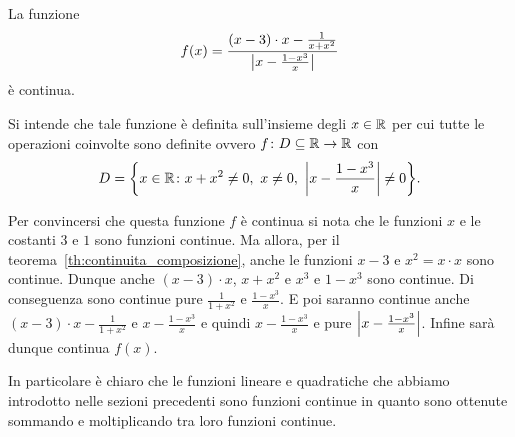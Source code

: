 \begin{example}
La funzione
\[
f(x) = \frac{(x-3)\cdot x -\frac{1}{x+x^2}}{{\left|x-\frac{1-x^3}{x}\right|}}
\]
è continua.

Si intende che tale funzione è definita sull'insieme degli $x\in \mathbb R$
per cui tutte le operazioni coinvolte sono definite ovvero
$f\colon D \subseteq \mathbb R \to \mathbb R$
con
\[
  D = \ENCLOSE{x\in \RR \colon x+x^2 \neq 0,\ x\neq 0,\ \abs{x-\frac{1-x^3}{x}}\neq 0}.
\]

Per convincersi che questa funzione $f$ è continua
si nota che le funzioni $x$ e le costanti $3$ e $1$ sono
funzioni continue.
Ma allora, per il teorema~\ref{th:continuita_composizione},
anche le funzioni $x-3$ e $x^2=x\cdot x$ sono continue.
Dunque anche $(x-3)\cdot x$, $x+x^2$ e $x^3$ e $1-x^3$ sono continue.
Di conseguenza sono continue pure $\frac 1{1+x^2}$ e $\frac{1-x^3}{x}$.
E poi saranno continue anche $(x-3)\cdot x - \frac 1{1+x^2}$ e $x-\frac{1-x^3}{x}$
e quindi $x-\frac{1-x^3}{x}$ e pure ${\left|x-\frac{1-x^3}{x}\right|}$. Infine sarà
dunque continua $f(x)$.
\end{example}

In particolare è chiaro che le funzioni lineare e quadratiche 
che abbiamo introdotto nelle sezioni precedenti sono funzioni continue
in quanto sono ottenute sommando e moltiplicando tra loro funzioni continue.


